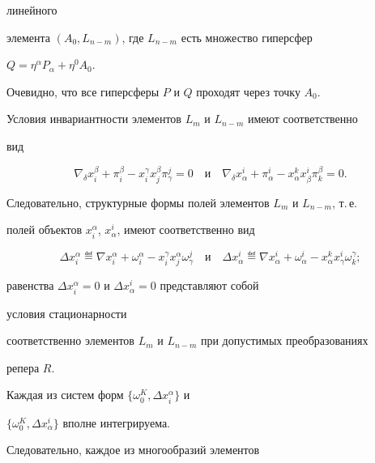 линейного 


элемента $(A_0,L_{n-m})$, где $L_{n-m}$ есть множество гиперсфер 


$Q=\eta^\alpha P_\alpha+\eta^0A_0$. 


Очевидно, что все гиперсферы $P$ и $Q$ проходят через точку $A_0$. 


 


Условия инвариантности элементов $L_m$ и $L_{n-m}$ имеют соответственно 


вид 


$$ 


\nabla_\delta x^\beta_i+\pi^\beta_i-x^\gamma_i 


x^\beta_j\pi^j_\gamma=0\quad 


\text{и}\quad 


\nabla_\delta x^i_\alpha+\pi^i_\alpha-x^k_\alpha 


x^i_\beta\pi^\beta_k=0. 


$$ 


Следовательно, структурные формы полей элементов $L_m$ и $L_{n-m}$, т.\,е. 


полей объектов $x^\alpha_i$, $x^i_\alpha$, имеют соответственно вид 


\begin{equation} 


\Delta x^\alpha_i\eqdef \nabla x^\alpha_i+\omega^\alpha_i- 


x^\gamma_i x^\alpha_j\omega^j_\gamma\quad 


\text{и}\quad 


\Delta x^i_\alpha\eqdef \nabla x^i_\alpha+\omega^i_\alpha- 


x^k_\alpha x^i_\gamma\omega^\gamma_k; 


\end{equation} 


равенства $\Delta x^\alpha_i=0$ и $\Delta x^i_\alpha=0$ представляют собой 


условия стационарности 


соответственно элементов $L_m$ и $L_{n-m}$ при допустимых преобразованиях 


репера $R$. 


 


Каждая из систем форм $\{\omega^K_0,\Delta x^\alpha_i\}$ и 


$\{\omega^K_0,\Delta x^i_\alpha\}$ вполне интегрируема. 


Следовательно, каждое из многообразий элементов 


